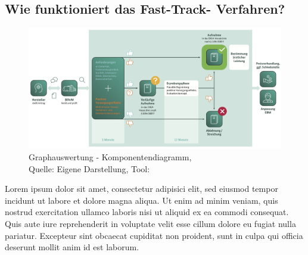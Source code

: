\subsection{Wie funktioniert das Fast-Track- Verfahren?}

\begin{figure}[H]
	\centering
	\includegraphics[width=450px, keepaspectratio]{assets/fastTrack_prozess.png}
	\caption{Graphauswertung - Komponentendiagramm,\\Quelle: Eigene Darstellung, Tool: \cite{visual_paradigm}}
\end{figure}
Lorem ipsum dolor sit amet, consectetur adipisici elit, sed eiusmod tempor incidunt ut labore et dolore magna aliqua. Ut enim ad minim veniam, quis nostrud exercitation ullamco laboris nisi ut aliquid ex ea commodi consequat. Quis aute iure reprehenderit in voluptate velit esse cillum dolore eu fugiat nulla pariatur. Excepteur sint obcaecat cupiditat non proident, sunt in culpa qui officia deserunt mollit anim id est laborum.

